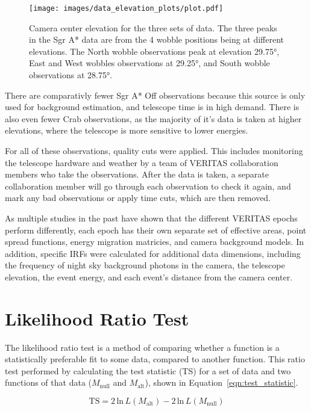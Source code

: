   \begin{figure}[ht]
    \centering
    \texttt{[image: images/data\_elevation\_plots/plot.pdf]}
    \caption[VERITAS Data Elevation Exposure]{
      Camera center elevation for the three sets of data.
      The three peaks in the Sgr A* data are from the 4 wobble positions being at different elevations.
      The North wobble observations peak at elevation \nicetilde\ang{29.75}, East and West wobbles observations at \nicetilde\ang{29.25}, and South wobble observations at \nicetilde\ang{28.75}.
    }
    \label{fig:datapointingelevations}
  \end{figure}

  There are comparativly fewer Sgr A* Off observations because this source is only used for background estimation, and telescope time is in high demand.
  There is also even fewer Crab observations, as the majority of it's data is taken at higher elevations, where the telescope is more sensitive to lower energies.
  
  For all of these observations, quality cuts were applied.
  This includes monitoring the telescope hardware and weather by a team of VERITAS collaboration members who take the observations.
  After the data is taken, a separate collaboration member will go through each observation to check it again, and mark any bad observations or apply time cuts, which are then removed.

  As multiple studies in the past have shown that the different VERITAS epochs perform differently, each epoch has their own separate set of effective areas, point spread functions, energy migration matricies, and camera background models.
  In addition, specific IRFs were calculated for additional data dimensions, including the frequency of night sky background photons in the camera, the telescope elevation, the event energy, and each event's distance from the camera center.

\section{Likelihood Ratio Test}
  The likelihood ratio test is a method of comparing whether a function is a statistically preferable fit to some data, compared to another function.
  This ratio test performed by calculating the test statistic (TS) for a set of data and two functions of that data ($M_{\text{null}}$ and $M_{\text{alt}}$), shown in Equation~\ref{eqn:test_statistic}.
  
  \begin{equation}\label{eqn:test_statistic}
    \text{TS} = 2 \, \text{ln} \, L \left(M_{\text{alt}} \right ) - 2 \, \text{ln} \, L \left( M_{\text{null}} \right )
  \end{equation}
  
